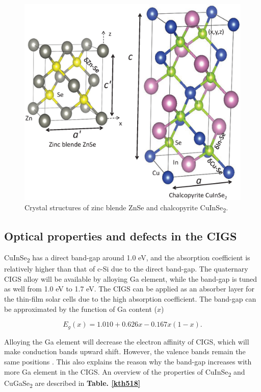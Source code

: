 \documentclass[a4paper, 12pt, titlepage,oneside,drop]{kthesis}
\begin{document}
\begin{figure}[H]
\centering
\includegraphics[scale=0.4]{cigscrystalstructure.eps} 
\caption{Crystal structures of zinc blende ZnSe and chalcopyrite CuInSe\textsubscript{2}.}
\label{crystal_cigs}
\end{figure}


\subsection{Optical properties and defects in the CIGS}
CuInSe\textsubscript{2} has a direct band-gap around 1.0 eV, and the absorption coefficient is relatively higher than that of c-Si due to the direct band-gap. The quaternary CIGS alloy will be available by alloying Ga element, while the band-gap is tuned as well from 
1.0 eV to 1.7 eV. The CIGS can be applied as an absorber layer for the thin-film solar cells due to the high absorption coefficient. The band-gap can be approximated by the function of Ga content ($x$) \cite{luque2011handbook}

\begin{equation}
E_g(x) = 1.010+0.626x-0.167x(1-x).
\end{equation}

Alloying the Ga element will decrease the electron affinity of CIGS, which will make conduction bands upward shift. However, the valence bands remain the same positions \cite{jiang2004does}. This also explains the reason why the band-gap increases with 
more Ga element in the CIGS. An overview of the properties of CuInSe\textsubscript{2} and CuGaSe\textsubscript{2} are described in \textbf{Table. \ref{kth518}} 
\end{document}
